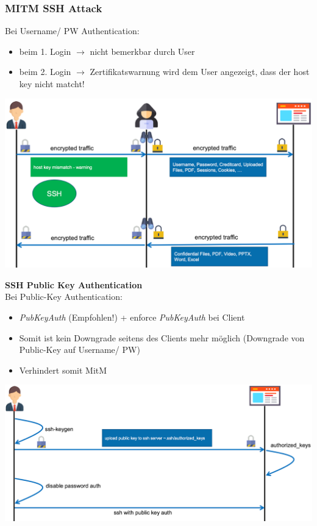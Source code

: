 \subsubsection{MITM SSH Attack}
Bei Username/ PW Authentication:
\begin{itemize}
    \item beim 1. Login $\rightarrow$ nicht bemerkbar durch User
    \item beim 2. Login $\rightarrow$ Zertifikatswarnung wird dem User angezeigt, dass der host key nicht matcht!
\end{itemize}

\begin{center}
    \vspace{-8pt}
    \includegraphics[width=.8\linewidth]{./img/09-mitm/ssh_overview}
    \vspace{-8pt}
\end{center}

\textbf{SSH Public Key Authentication}\\
Bei Public-Key Authentication:
\begin{itemize}
    \item \textit{PubKeyAuth} (Empfohlen!) + enforce \textit{PubKeyAuth} bei Client
    \item Somit ist kein Downgrade seitens des Clients  mehr möglich (Downgrade von Public-Key auf Username/ PW)
    \item Verhindert somit MitM
\end{itemize}

\begin{center}
    \vspace{-8pt}
    \includegraphics[width=.8\linewidth]{./img/09-mitm/pk_auth}
    \vspace{-8pt}
\end{center}


